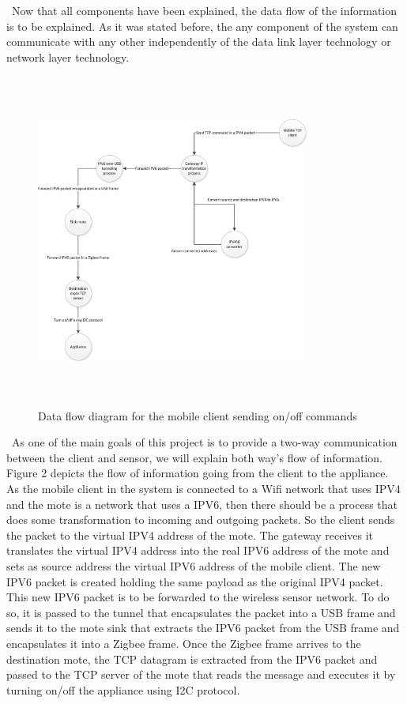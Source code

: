 \documentclass[conference]{IEEEtran}
\begin{document}
\ Now that all components have been explained, the data flow of the information is to be explained. As it was stated before, the any component of the system can communicate with any other independently of the data link layer technology or network layer technology.

\begin{figure}[htbp]
\centering
\includegraphics[height=110mm,width=90mm]{images/control_appliance_data_flow.jpg}
\caption{Data flow diagram for the mobile client sending on/off commands}
\label{fig:control_appliance}
\end{figure}

\
As one of the main goals of this project is to provide a two-way communication between the client and sensor, we will explain both way's flow of information. Figure 2 depicts the flow of information going from the client to the appliance. As the mobile client in the system is connected to a Wifi network that uses IPV4 and the mote is a network that uses a IPV6, then there should be a process that does some transformation to incoming and outgoing packets. So the client sends the packet to the virtual IPV4 address of the mote. The gateway receives it translates the virtual IPV4 address into the real IPV6 address of the mote and sets as source address the virtual IPV6 address of the mobile client. The new IPV6 packet is created holding the same payload as the original IPV4 packet. This new IPV6 packet is to be forwarded to the wireless sensor network. To do so, it is passed to the tunnel that encapsulates the packet into a USB frame and sends it to the mote sink that extracts the IPV6 packet from the USB frame and encapsulates it into a Zigbee frame. Once the Zigbee frame arrives to the destination mote, the TCP datagram is extracted from the IPV6 packet and passed to the TCP server of the mote that reads the message and executes it by turning on/off the appliance using I2C protocol.
\end{document}
